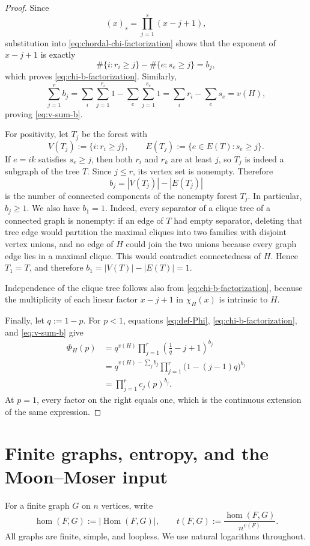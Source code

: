 \documentclass[11pt]{article}
\numberwithin{equation}{section}
\DeclareMathOperator{\Hom}{Hom}
\DeclareMathOperator{\homnum}{hom}
\newcommand{\PhiH}{\Phi_H}
\begin{document}
\begin{proof}
Since
\[
 (x)_s=\prod_{j=1}^s(x-j+1),
\]
substitution into \eqref{eq:chordal-chi-factorization} shows that the
exponent of $x-j+1$ is exactly
\[
 \#\{i:r_i\geq j\}-\#\{e:s_e\geq j\}=b_j,
\]
which proves \eqref{eq:chi-b-factorization}.  Similarly,
\[
 \sum_{j=1}^r b_j
 =
 \sum_i\sum_{j=1}^{r_i}1
 -
 \sum_e\sum_{j=1}^{s_e}1
 =
 \sum_i r_i-\sum_e s_e
 =v(H),
\]
proving \eqref{eq:v-sum-b}.

For positivity, let $T_j$ be the forest with
\[
 V(T_j):=\{i:r_i\geq j\},
 \qquad
 E(T_j):=\{e\in E(T):s_e\geq j\}.
\]
If $e=ik$ satisfies $s_e\geq j$, then both $r_i$ and $r_k$ are at least
$j$, so $T_j$ is indeed a subgraph of the tree $T$.  Since $j\leq r$,
its vertex set is nonempty.  Therefore
\[
 b_j=|V(T_j)|-|E(T_j)|
\]
is the number of connected components of the nonempty forest $T_j$.
In particular, $b_j\geq1$.  We also have $b_1=1$.  Indeed, every
separator of a clique tree of a connected graph is nonempty: if an edge
of $T$ had empty separator, deleting that tree edge would partition the
maximal cliques into two families with disjoint vertex unions, and no edge
of $H$ could join the two unions because every graph edge lies in a
maximal clique.  This would contradict connectedness of $H$.  Hence
$T_1=T$, and therefore $b_1=|V(T)|-|E(T)|=1$.

Independence of the clique tree follows also from
\eqref{eq:chi-b-factorization}, because the multiplicity of each linear
factor $x-j+1$ in $\chi_H(x)$ is intrinsic to $H$.

Finally, let $q:=1-p$.  For $p<1$, equations
\eqref{eq:def-Phi}, \eqref{eq:chi-b-factorization}, and
\eqref{eq:v-sum-b} give
\[
 \begin{aligned}
 \PhiH(p)
 &=q^{v(H)}
   \prod_{j=1}^r\left(\frac{1}{q}-j+1\right)^{b_j}\\
 &=q^{v(H)-\sum_jb_j}
   \prod_{j=1}^r\bigl(1-(j-1)q\bigr)^{b_j}\\
 &=\prod_{j=1}^r c_j(p)^{b_j}.
 \end{aligned}
\]
At $p=1$, every factor on the right equals one, which is the continuous
extension of the same expression.
\end{proof}

\section{Finite graphs, entropy, and the Moon--Moser input}

For a finite graph $G$ on $n$ vertices, write
\[
 \homnum(F,G):=|\Hom(F,G)|,
 \qquad
 t(F,G):=\frac{\homnum(F,G)}{n^{v(F)}}.
\]
All graphs are finite, simple, and loopless.  We use natural logarithms
throughout.
\end{document}
